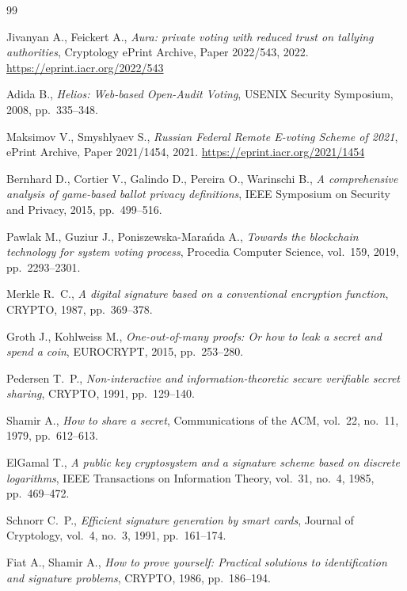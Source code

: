 \documentclass[12pt,a4paper,oneside]{report}
\begin{document}
\begin{thebibliography}{99}

Jivanyan A., Feickert A.,
\textit{Aura: private voting with reduced trust on tallying authorities},
Cryptology ePrint Archive, Paper 2022/543, 2022.
\url{https://eprint.iacr.org/2022/543}

Adida B.,
\textit{Helios: Web-based Open-Audit Voting},
USENIX Security Symposium, 2008, pp.~335--348.

Maksimov V., Smyshlyaev S.,
\textit{Russian Federal Remote E-voting Scheme of 2021},
ePrint Archive, Paper 2021/1454, 2021.
\url{https://eprint.iacr.org/2021/1454}

Bernhard D., Cortier V., Galindo D., Pereira O., Warinschi B.,
\textit{A comprehensive analysis of game-based ballot privacy definitions},
IEEE Symposium on Security and Privacy, 2015, pp.~499--516.

Pawlak M., Guziur J., Poniszewska-Mara\'{n}da A.,
\textit{Towards the blockchain technology for system voting process},
Procedia Computer Science, vol.~159, 2019, pp.~2293--2301.

Merkle R.~C.,
\textit{A digital signature based on a conventional encryption function},
CRYPTO, 1987, pp.~369--378.

Groth J., Kohlweiss M.,
\textit{One-out-of-many proofs: Or how to leak a secret and spend a coin},
EUROCRYPT, 2015, pp.~253--280.

Pedersen T.~P.,
\textit{Non-interactive and information-theoretic secure verifiable secret sharing},
CRYPTO, 1991, pp.~129--140.

Shamir A.,
\textit{How to share a secret},
Communications of the ACM, vol.~22, no.~11, 1979, pp.~612--613.

ElGamal T.,
\textit{A public key cryptosystem and a signature scheme based on discrete logarithms},
IEEE Transactions on Information Theory, vol.~31, no.~4, 1985, pp.~469--472.

Schnorr C.~P.,
\textit{Efficient signature generation by smart cards},
Journal of Cryptology, vol.~4, no.~3, 1991, pp.~161--174.

Fiat A., Shamir A.,
\textit{How to prove yourself: Practical solutions to identification and signature problems},
CRYPTO, 1986, pp.~186--194.


\end{thebibliography}
\end{document}
